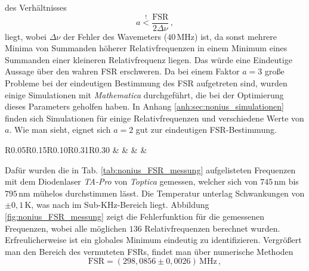 des Verhältnisses
\begin{equation}\label{eq:nonius_faktor}
	a\stackrel{!}{<}\frac{\text{FSR}}{2\Delta\nu}\,,
\end{equation}
liegt, wobei $\Delta\nu$ der Fehler des Wavemeters ($40\,$MHz) ist, da sonst
mehrere Minima von Summanden höherer Relativfrequenzen in einem Minimum
eines Summanden einer kleineren Relativfrequenz liegen. Das würde eine
Eindeutige Aussage über den wahren FSR erschweren. Da bei
einem Faktor $a=3$ große Probleme bei der eindeutigen Bestimmung des FSR
aufgetreten sind, wurden einige Simulationen mit \textit{Mathematica}
durchgeführt, die bei der Optimierung dieses Parameters geholfen haben.
In Anhang \ref{anh:sec:nonius_simulationen} finden sich Simulationen für einige
Relativfrequenzen und verschiedene Werte von $a$. Wie man sieht, eignet sich
$a=2$ gut zur eindeutigen FSR-Bestimmung.\par
\begin{table}[h]
	\begin{tabular}{R{0.05\textwidth}R{0.15\textwidth}R{0.10\textwidth}R{0.31\textwidth}R{0.30\textwidth}}
		\toprule
		 &
		 &
		 &
		 &
		\\
		\midrule[1px]
		\hline
		
		\bottomrule[1px]
	\end{tabular}
	\caption[FSR Messung]{Aufgelistet sind die Messwerte für die Bestimmung des
	FSRs des FPIs. Messdatum: 14.01.2012, 1:30 Uhr}
	\label{tab:nonius_FSR_messung}
\end{table}
Dafür wurden die in Tab. \ref{tab:nonius_FSR_messung} aufgelisteten Frequenzen
mit dem Diodenlaser \textit{TA-Pro} von \textit{Toptica} gemessen, welcher sich
von $745\,$nm bis $795\,$nm mühelos durchstimmen lässt.
Die Temperatur unterlag Schwankungen von $\pm0,1\,$K, was nach
\cite{kuschnick:2000:diplomarbeit} im Sub-KHz-Bereich liegt.
Abbildung \ref{fig:nonius_FSR_messung} zeigt die Fehlerfunktion für die
gemessenen Frequenzen, wobei alle möglichen $136$ Relativfrequenzen berechnet
wurden. Erfreulicherweise ist ein globales Minimum eindeutig zu identifizieren.
Vergrößert man den Bereich des vermuteten FSRs, findet man über numerische
Methoden
\begin{equation}\label{eq:FSR_messung}
	\text{FSR}=(298,0856\pm0,0026)\,\text{MHz}\,,
\end{equation}
